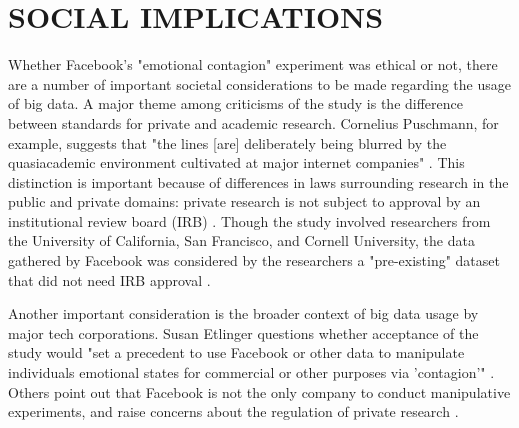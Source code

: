\section{SOCIAL IMPLICATIONS}
Whether Facebook’s "emotional contagion"
experiment was ethical or
not, there are a number of important
societal considerations to be made regarding
the usage of big data. A major
theme among criticisms of the study
is the difference between standards
for private and academic research.
Cornelius Puschmann, for example,
suggests that "the lines [are] deliberately
being blurred by the quasiacademic
environment cultivated at
major internet companies" \cite{terrain}. This
distinction is important because of
differences in laws surrounding research
in the public and private domains:
private research is not subject
to approval by an institutional review
board (IRB) \cite{irb}. Though the study
involved researchers from the University
of California, San Francisco, and
Cornell University, the data gathered by Facebook
was considered by the researchers a "pre-existing"
dataset that did not need IRB approval \cite{atlantic}. \par
Another important consideration
is the broader context of big data usage
by major tech corporations. Susan
Etlinger questions whether acceptance
of the study would "set a precedent
to use Facebook or other data
to manipulate individuals emotional
states for commercial or other purposes
via 'contagion'" \cite{etlinger}. Others
point out that Facebook is not the
only company to conduct manipulative
experiments, and raise concerns
about the regulation of private research
\cite{guardian}.